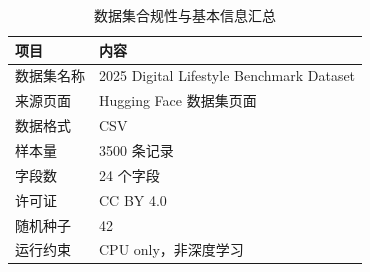 \begin{table}[H]
\centering
\caption{数据集合规性与基本信息汇总}
\label{tab:dataset-compliance-summary}
\begin{tabular}{ll}
\toprule
项目 & 内容 \\
\midrule
数据集名称 & 2025 Digital Lifestyle Benchmark Dataset \\
来源页面 & Hugging Face 数据集页面 \\
数据格式 & CSV \\
样本量 & 3500 条记录 \\
字段数 & 24 个字段 \\
许可证 & CC BY 4.0 \\
随机种子 & 42 \\
运行约束 & CPU only，非深度学习 \\
\bottomrule
\end{tabular}
\end{table}

